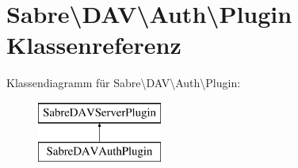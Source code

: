 \hypertarget{class_sabre_1_1_d_a_v_1_1_auth_1_1_plugin}{}\section{Sabre\textbackslash{}D\+AV\textbackslash{}Auth\textbackslash{}Plugin Klassenreferenz}
\label{class_sabre_1_1_d_a_v_1_1_auth_1_1_plugin}
Klassendiagramm für Sabre\textbackslash{}D\+AV\textbackslash{}Auth\textbackslash{}Plugin\+:\begin{figure}[H]
\begin{center}
\leavevmode
\includegraphics[height=2.000000cm]{class_sabre_1_1_d_a_v_1_1_auth_1_1_plugin}
\end{center}
\end{figure}
